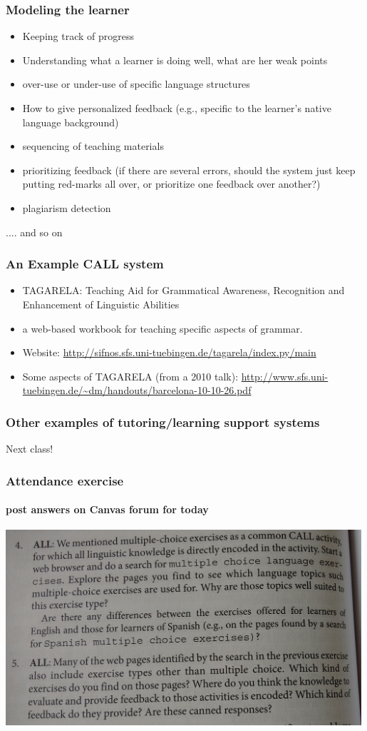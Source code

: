 \documentclass{beamer}
\begin{document}
\begin{frame}
\frametitle{Modeling the learner}
\begin{itemize}
\item  Keeping track of progress
\item Understanding what a learner is doing well, what are her weak points
\item over-use or under-use of specific language structures
\item How to give personalized feedback (e.g., specific to the learner's native language background)
\item sequencing of teaching materials
\item prioritizing feedback (if there are several errors, should the system just keep putting red-marks all over, or prioritize one feedback over another?)
\item plagiarism detection
\end{itemize}
.... and so on
\end{frame}

\begin{frame}
\frametitle{An Example CALL system}
\begin{itemize}
\item TAGARELA: Teaching Aid for Grammatical Awareness, Recognition and Enhancement of Linguistic Abilities
\item a web-based workbook for teaching specific aspects of grammar.
\item Website: \url{http://sifnos.sfs.uni-tuebingen.de/tagarela/index.py/main}
\item Some aspects of TAGARELA (from a 2010 talk): \url{http://www.sfs.uni-tuebingen.de/~dm/handouts/barcelona-10-10-26.pdf}
\end{itemize}
\end{frame}

\begin{frame}
\frametitle{Other examples of tutoring/learning support systems}
Next class!
\end{frame}

\begin{frame} %
\frametitle{Attendance exercise} \framesubtitle{post answers on Canvas forum for today}
\includegraphics[width=0.99\textwidth]{13SepExercise.jpg}
\end{frame}
\end{document}
